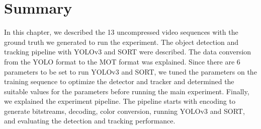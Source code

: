 \section{Summary}
\label{sec:methods/summary}

In this chapter, we described the 13 uncompressed video sequences with the ground truth we generated to run the experiment. The object detection and tracking pipeline with YOLOv3 and SORT were described. The data conversion from the YOLO format to the MOT format was explained. Since there are 6 parameters to be set to run YOLOv3 and SORT, we tuned the parameters on the training sequence to optimize the detector and tracker and determined the suitable values for the parameters before running the main experiment. Finally, we explained the experiment pipeline. The pipeline starts with encoding to generate bitstreams, decoding, color conversion, running YOLOv3 and SORT, and evaluating the detection and tracking performance.